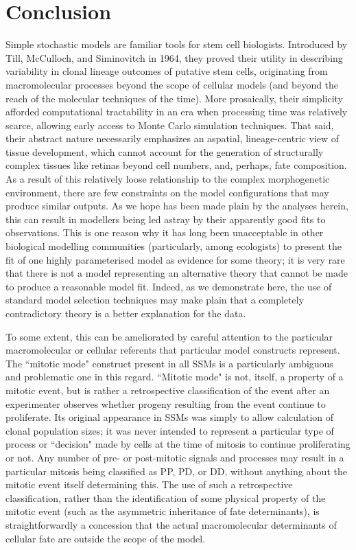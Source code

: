 \section{Conclusion}

Simple stochastic models are familiar tools for stem cell biologists. Introduced by Till, McCulloch, and Siminovitch in 1964, they proved their utility in describing variability in clonal lineage outcomes of putative stem cells, originating from macromolecular processes beyond the scope of cellular models (and beyond the reach of the molecular techniques of the time). More prosaically, their simplicity afforded computational tractability in an era when processing time was relatively scarce, allowing early access to Monte Carlo simulation techniques. That said, their abstract nature necessarily emphasizes an aspatial, lineage-centric view of tissue development, which cannot account for the generation of structurally complex tissues like retinas beyond cell numbers, and, perhaps, fate composition. As a result of this relatively loose relationship to the complex morphogenetic environment, there are few constraints on the model configurations that may produce similar outputs. As we hope has been made plain by the analyses herein, this can result in modellers being led astray by their apparently good fits to observations. This is one reason why it has long been unacceptable in other biological modelling communities (particularly, among ecologists) to present the fit of one highly parameterised model as evidence for some theory; it is very rare that there is not a model representing an alternative theory that cannot be made to produce a reasonable model fit. Indeed, as we demonstrate here, the use of standard model selection techniques may make plain that a completely contradictory theory is a better explanation for the data.

To some extent, this can be ameliorated by careful attention to the particular macromolecular or cellular referents that particular model constructs represent. The ``mitotic mode" construct present in all SSMs is a particularly ambiguous and problematic one in this regard. ``Mitotic mode" is not, itself, a property of a mitotic event, but is rather a retrospective classification of the event after an experimenter observes whether progeny resulting from the event continue to proliferate. Its original appearance in SSMs was simply to allow calculation of clonal population sizes; it was never intended to represent a particular type of process or ``decision" made by cells at the time of mitosis to continue proliferating or not. Any number of pre- or post-mitotic signals and processes may result in a particular mitosis being classified as PP, PD, or DD, without anything about the mitotic event itself determining this. The use of such a retrospective classification, rather than the identification of some physical property of the mitotic event (such as the asymmetric inheritance of fate determinants), is straightforwardly a concession that the actual macromolecular determinants of cellular fate are outside the scope of the model.

